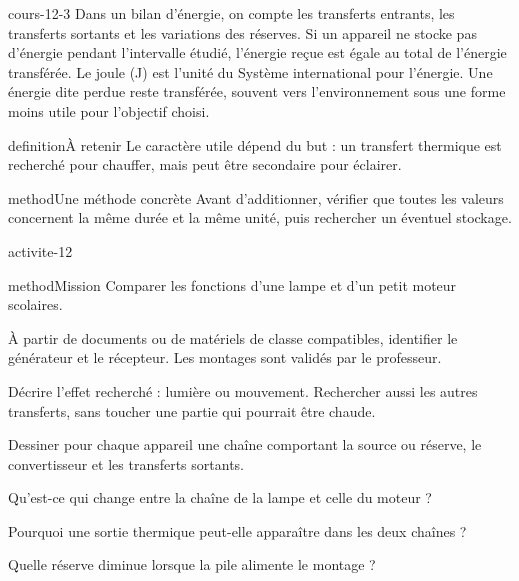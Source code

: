\documentclass[12pt,twoside,openany]{book}
\begin{document}
\label{ch-12-cours-3}
\begin{pcFiche}{cours-12-3}
Dans un bilan d’énergie, on compte les transferts entrants, les transferts sortants et les variations des réserves. Si un appareil ne stocke pas d’énergie pendant l’intervalle étudié, l’énergie reçue est égale au total de l’énergie transférée. Le joule (J) est l’unité du Système international pour l’énergie. Une énergie dite perdue reste transférée, souvent vers l’environnement sous une forme moins utile pour l’objectif choisi.\par
{}
\begin{pcEncadre}{definition}{À retenir}
Le caractère utile dépend du but : un transfert thermique est recherché pour chauffer, mais peut être secondaire pour éclairer.\par
\end{pcEncadre}
\begin{pcEncadre}{method}{Une méthode concrète}
Avant d’additionner, vérifier que toutes les valeurs concernent la même durée et la même unité, puis rechercher un éventuel stockage.\par
\end{pcEncadre}
\end{pcFiche}
\label{ch-12-activite}
\begin{pcFiche}{activite-12}
\begin{pcEncadre}{method}{Mission}
Comparer les fonctions d’une lampe et d’un petit moteur scolaires.\par
\end{pcEncadre}
\begin{questions}
\item À partir de documents ou de matériels de classe compatibles, identifier le générateur et le récepteur. Les montages sont validés par le professeur.
\item Décrire l’effet recherché : lumière ou mouvement. Rechercher aussi les autres transferts, sans toucher une partie qui pourrait être chaude.
\item Dessiner pour chaque appareil une chaîne comportant la source ou réserve, le convertisseur et les transferts sortants.
\end{questions}
\begin{questions}
\item Qu’est-ce qui change entre la chaîne de la lampe et celle du moteur ?
\item Pourquoi une sortie thermique peut-elle apparaître dans les deux chaînes ?
\item Quelle réserve diminue lorsque la pile alimente le montage ?
\end{questions}
\end{pcFiche}
\end{document}
